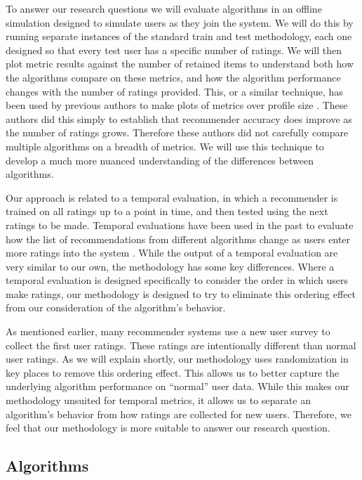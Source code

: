 \documentclass[letterpaper]{sig-alternate}
\begin{document}
  To answer our research questions we will evaluate algorithms in an offline simulation designed to simulate users as they join the system.
  We will do this by running separate instances of the standard train and test methodology, each one designed so that every test user has a specific  number of ratings.
  We will then plot metric results against the number of retained items to understand both how the algorithms compare on these metrics, and how the algorithm performance changes with the number of ratings provided.
  This, or a similar technique, has been used by previous authors to make plots of metrics over profile size \cite{DrennerInitialExperiance, TenIsEnough, AdaptiveBootstrap}.
  These authors did this simply to establish that recommender accuracy does improve as the number of ratings grows.
  Therefore these authors did not carefully compare multiple algorithms on a breadth of metrics.
  We will use this technique to develop a much more nuanced understanding of the differences between algorithms.

  Our approach is related to a temporal evaluation, in which a recommender is trained on all ratings up to a point in time, and then tested using the next ratings to be made.
  Temporal evaluations have been used in the past to evaluate how the list of recommendations from different algorithms change as users enter more ratings into the system \cite{LathiaTemporal}.
  While the output of a temporal evaluation are very similar to our own, the methodology has some key differences.
  Where a temporal evaluation is designed specifically to consider the order in which users make ratings, our methodology is designed to try to eliminate this ordering effect from our consideration of the algorithm's behavior.

  As mentioned earlier, many recommender systems use a new user survey to collect the first user ratings.
  These ratings are intentionally different than normal user ratings.
  As we will explain shortly, our methodology uses randomization in key places to remove this ordering effect.
  This allows us to better capture the underlying algorithm performance on ``normal'' user data.
  While this makes our methodology unsuited for temporal metrics, it allows us to separate an algorithm's behavior from how ratings are collected for new users.
  Therefore, we feel that our methodology is more suitable to answer our research question.

  \subsection*{Algorithms}
\end{document}
